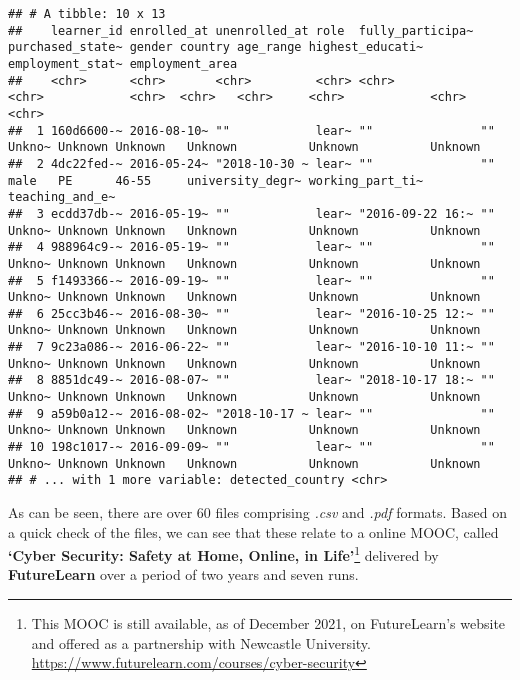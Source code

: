 \documentclass[
]{article}
\begin{document}
\begin{verbatim}
## # A tibble: 10 x 13
##    learner_id enrolled_at unenrolled_at role  fully_participa~ purchased_state~ gender country age_range highest_educati~ employment_stat~ employment_area
##    <chr>      <chr>       <chr>         <chr> <chr>            <chr>            <chr>  <chr>   <chr>     <chr>            <chr>            <chr>          
##  1 160d6600-~ 2016-08-10~ ""            lear~ ""               ""               Unkno~ Unknown Unknown   Unknown          Unknown          Unknown        
##  2 4dc22fed-~ 2016-05-24~ "2018-10-30 ~ lear~ ""               ""               male   PE      46-55     university_degr~ working_part_ti~ teaching_and_e~
##  3 ecdd37db-~ 2016-05-19~ ""            lear~ "2016-09-22 16:~ ""               Unkno~ Unknown Unknown   Unknown          Unknown          Unknown        
##  4 988964c9-~ 2016-05-19~ ""            lear~ ""               ""               Unkno~ Unknown Unknown   Unknown          Unknown          Unknown        
##  5 f1493366-~ 2016-09-19~ ""            lear~ ""               ""               Unkno~ Unknown Unknown   Unknown          Unknown          Unknown        
##  6 25cc3b46-~ 2016-08-30~ ""            lear~ "2016-10-25 12:~ ""               Unkno~ Unknown Unknown   Unknown          Unknown          Unknown        
##  7 9c23a086-~ 2016-06-22~ ""            lear~ "2016-10-10 11:~ ""               Unkno~ Unknown Unknown   Unknown          Unknown          Unknown        
##  8 8851dc49-~ 2016-08-07~ ""            lear~ "2018-10-17 18:~ ""               Unkno~ Unknown Unknown   Unknown          Unknown          Unknown        
##  9 a59b0a12-~ 2016-08-02~ "2018-10-17 ~ lear~ ""               ""               Unkno~ Unknown Unknown   Unknown          Unknown          Unknown        
## 10 198c1017-~ 2016-09-09~ ""            lear~ ""               ""               Unkno~ Unknown Unknown   Unknown          Unknown          Unknown        
## # ... with 1 more variable: detected_country <chr>
\end{verbatim}

As can be seen, there are over 60 files comprising \emph{.csv} and
\emph{.pdf} formats. Based on a quick check of the files, we can see
that these relate to a online MOOC, called \textbf{`Cyber Security:
Safety at Home, Online, in Life'}\footnote{This MOOC is still available,
  as of December 2021, on FutureLearn's website and offered as a
  partnership with Newcastle University.
  \url{https://www.futurelearn.com/courses/cyber-security}} delivered by
\textbf{FutureLearn} over a period of two years and seven runs.
\end{document}
